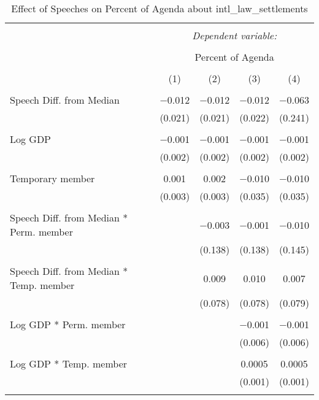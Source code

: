 
\begin{table}[!htbp] \centering 
  \caption{Effect of Speeches on Percent of Agenda about intl_law_settlements} 
  \label{} 
\begin{tabular}{@{\extracolsep{5pt}}lcccc} 
\\[-1.8ex]\hline 
\hline \\[-1.8ex] 
 & \multicolumn{4}{c}{\textit{Dependent variable:}} \\ 
\cline{2-5} 
\\[-1.8ex] & \multicolumn{4}{c}{Percent of Agenda} \\ 
\\[-1.8ex] & (1) & (2) & (3) & (4)\\ 
\hline \\[-1.8ex] 
 Speech Diff. from Median & $-$0.012 & $-$0.012 & $-$0.012 & $-$0.063 \\ 
  & (0.021) & (0.021) & (0.022) & (0.241) \\ 
  & & & & \\ 
 Log GDP & $-$0.001 & $-$0.001 & $-$0.001 & $-$0.001 \\ 
  & (0.002) & (0.002) & (0.002) & (0.002) \\ 
  & & & & \\ 
 Temporary member & 0.001 & 0.002 & $-$0.010 & $-$0.010 \\ 
  & (0.003) & (0.003) & (0.035) & (0.035) \\ 
  & & & & \\ 
 Speech Diff. from Median * Perm. member &  & $-$0.003 & $-$0.001 & $-$0.010 \\ 
  &  & (0.138) & (0.138) & (0.145) \\ 
  & & & & \\ 
 Speech Diff. from Median * Temp. member &  & 0.009 & 0.010 & 0.007 \\ 
  &  & (0.078) & (0.078) & (0.079) \\ 
  & & & & \\ 
 Log GDP * Perm. member &  &  & $-$0.001 & $-$0.001 \\ 
  &  &  & (0.006) & (0.006) \\ 
  & & & & \\ 
 Log GDP * Temp. member &  &  & 0.0005 & 0.0005 \\ 
  &  &  & (0.001) & (0.001) \\ 
  & & & & \\ 

\end{tabular}
\end{table}
